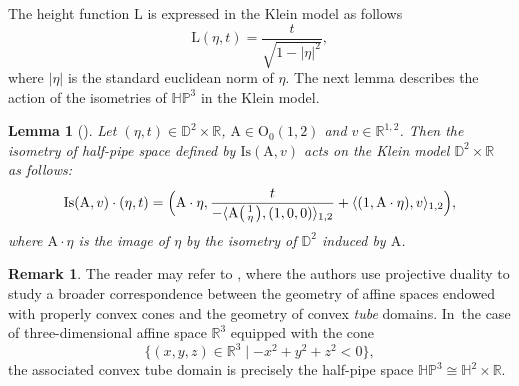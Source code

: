 \documentclass[JEP,XML,SOM,Unicode,NoEqCountersInSection, NoFloatCountersInSection,published]{cedram}
\newenvironment{smallpmatrix}{\big(\begin{smallmatrix}}{\end{smallmatrix}\big)}
\theoremstyle{plain}
\newtheorem{lemma}[cor]{Lemma}
\theoremstyle{definition}
\newtheorem{remark}[cor]{Remark}
\newcommand{\HP}{\mathbb{HP}^3}
\begin{document}
The height function $\mathrm{L}$ is expressed in the Klein model as follows
\begin{equation}\label{formule_L_Klein}
\mathrm{L}(\eta,t)=\frac{t}{\sqrt{1-\lvert\eta\rvert^{2}}},
\end{equation} where $\lvert \eta\vert$ is the standard euclidean norm of $\eta$.
The next lemma describes the action of the isometries of $\HP$ in the Klein model.
\begin{lemma}[{\cite[Lem.\,2.26]{barbotfillastre}}]\label{rotationHP}
Let $(\eta, t)\in \mathbb{D}^2\times\mathbb{R}$, $\mathrm{A}\in \mathrm{O}_{0}(1,2)$ and $v\in \mathbb{R}^{1,2}$. Then the isometry of
half-pipe space defined by $\mathrm{Is}(\mathrm{A},v)$ acts on the Klein model $\mathbb{D}^2\times\mathbb{R}$ as follows:
\[
\mathrm{Is}(\mathrm{A},v)\cdot(\eta,t)=\Bigl(\mathrm{A}\cdot \eta, \frac{t}{-\langle \mathrm{A}\begin{smallpmatrix}
1 \\
\eta
\end{smallpmatrix} ,(1,0,0)\rangle_{1,2}}+\langle (1,\mathrm{A}\cdot \eta), v\rangle_{1,2} \Bigr),
\]
where $\mathrm{A}\cdot \eta$ is the image of $\eta$ by the isometry
of $\mathbb{D}^2$ induced by $\mathrm{A}$.
\end{lemma}

\begin{remark}
The reader may refer to \cite{ConvexAnal,affine}, where the authors use projective duality to study a broader correspondence between the geometry of affine spaces endowed with properly convex cones and the geometry of convex \emph{tube} domains. In~the case of three-dimensional affine space $\mathbb{R}^3$ equipped with the cone
\[
\{(x, y, z) \in \mathbb{R}^3 \mid -x^2 + y^2 + z^2 < 0\},
\]
the associated convex tube domain is precisely the half-pipe space $\HP \cong \mathbb{H}^2 \times \mathbb{R}$.
\end{remark}
\end{document}
